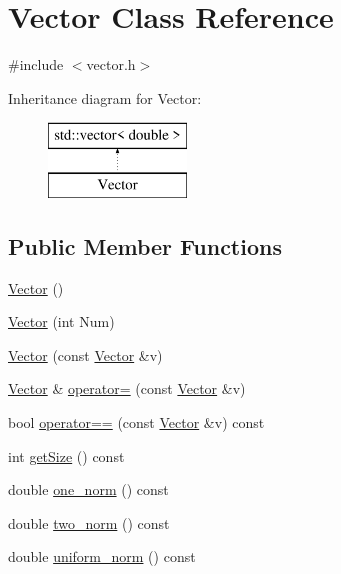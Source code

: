 \hypertarget{class_vector}{}\section{Vector Class Reference}
\label{class_vector}


{\ttfamily \#include $<$vector.\+h$>$}

Inheritance diagram for Vector\+:\begin{figure}[H]
\begin{center}
\leavevmode
\includegraphics[height=2.000000cm]{class_vector}
\end{center}
\end{figure}
\subsection*{Public Member Functions}
\begin{DoxyCompactItemize}
\item 
\mbox{\hyperlink{class_vector_a6f80c73b5f18dcf3f8e36065bdc8b9e5}{Vector}} ()
\item 
\mbox{\hyperlink{class_vector_acbdf66550f2caa0a64e0b356fb63a277}{Vector}} (int Num)
\item 
\mbox{\hyperlink{class_vector_a5f04e343b7306ad11f8a82c89b486764}{Vector}} (const \mbox{\hyperlink{class_vector}{Vector}} \&v)
\item 
\mbox{\hyperlink{class_vector}{Vector}} \& \mbox{\hyperlink{class_vector_ae48c467a9f65d60e2f7455aba4ca1239}{operator=}} (const \mbox{\hyperlink{class_vector}{Vector}} \&v)
\item 
bool \mbox{\hyperlink{class_vector_ade5fbd0cd01b034d1907e0c93433320c}{operator==}} (const \mbox{\hyperlink{class_vector}{Vector}} \&v) const
\item 
int \mbox{\hyperlink{class_vector_afbb7966ec4107c43ec15cccc47fcaef7}{get\+Size}} () const
\item 
double \mbox{\hyperlink{class_vector_a6752a90058ddef427ca6aed12946a737}{one\+\_\+norm}} () const
\item 
double \mbox{\hyperlink{class_vector_a4f501290a50d057bb6c57ea64d7e70a4}{two\+\_\+norm}} () const
\item 
double \mbox{\hyperlink{class_vector_a50b72131eaf3698a9876d99ab6912a32}{uniform\+\_\+norm}} () const
\end{DoxyCompactItemize}
